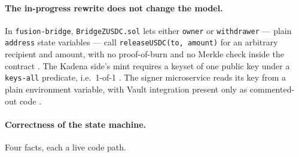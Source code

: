 \paragraph{The in-progress rewrite does not change the model.} In \texttt{fusion-bridge},
\texttt{Bridge\allowbreak{}ZUSDC.\allowbreak{}sol} lets either \texttt{owner} or \texttt{withdrawer} --- plain \texttt{address}
state variables --- call \texttt{release\allowbreak{}USDC(to, amount)} for an arbitrary recipient and amount, with
no proof-of-burn and no Merkle check inside the contract
. The Kadena
side's mint requires a keyset of one public key under a \texttt{keys-all} predicate, i.e.\ 1-of-1
. The signer
microservice reads its key from a plain environment variable, with Vault integration present only as
commented-out code .
\inprogress

\paragraph{Correctness of the state machine.} Four facts, each a live code path. \shipped

